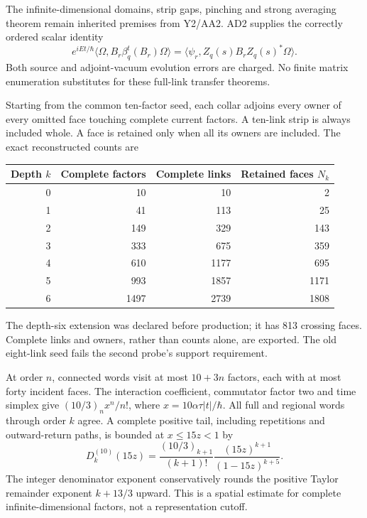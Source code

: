The infinite-dimensional domains, strip gaps, pinching and strong averaging theorem remain inherited premises from Y2/AA2. AD2 supplies the correctly ordered scalar identity
\begin{equation}
 e^{iEt/\hbar}\langle\Omega,B_r\beta_q^t(B_r)\Omega\rangle
 =\langle\psi_r,Z_q(s)B_r Z_q(s)^*\Omega\rangle.
 \label{r28:eq:ai3-ordered-transfer}
\end{equation}
Both source and adjoint-vacuum evolution errors are charged. No finite matrix enumeration substitutes for these full-link transfer theorems.

Starting from the common ten-factor seed, each collar adjoins every owner of every omitted face touching complete current factors. A ten-link strip is always included whole. A face is retained only when all its owners are included. The exact reconstructed counts are
\begin{center}\small
\begin{tabular}{@{}rrrr@{}}\toprule
Depth $k$ & Complete factors & Complete links & Retained faces $N_k$\\\midrule
0&10&10&2\\1&41&113&25\\2&149&329&143\\
3&333&675&359\\4&610&1177&695\\5&993&1857&1171\\
6&1497&2739&1808\\\bottomrule
\end{tabular}
\end{center}
The depth-six extension was declared before production; it has 813 crossing faces. Complete links and owners, rather than counts alone, are exported. The old eight-link seed fails the second probe's support requirement.

At order $n$, connected words visit at most $10+3n$ factors, each with at most forty incident faces. The interaction coefficient, commutator factor two and time simplex give $(10/3)_n x^n/n!$, where $x=10\alpha\tau|t|/\hbar$. All full and regional words through order $k$ agree. A complete positive tail, including repetitions and outward-return paths, is bounded at $x\le15z<1$ by
\begin{equation}
 D_k^{(10)}(15z)=\frac{(10/3)_{k+1}}{(k+1)!}
 \frac{(15z)^{k+1}}{(1-15z)^{k+5}}.
 \label{r28:eq:ai3-collar-tail}
\end{equation}
The integer denominator exponent conservatively rounds the positive Taylor remainder exponent $k+13/3$ upward. This is a spatial estimate for complete infinite-dimensional factors, not a representation cutoff.

